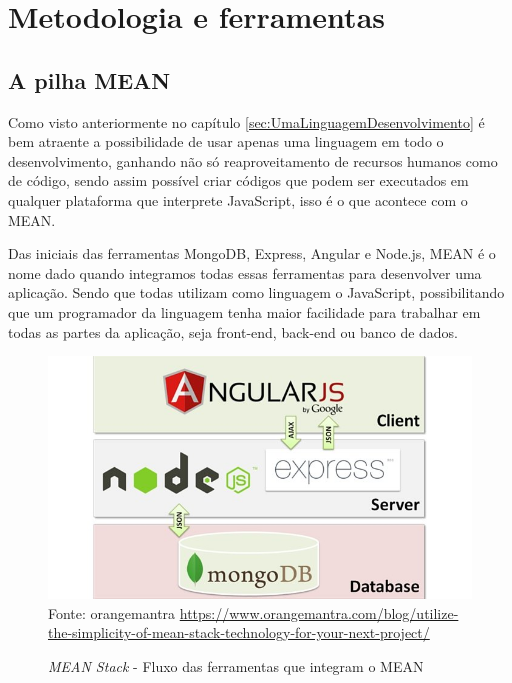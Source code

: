 \documentclass[
	12pt,				%
	openright,			%
	twoside,			%
	a4paper,			%
	english,			%
	brazil				%
	]{abntex2}
\begin{document}
\chapter{Metodologia e ferramentas}

\section{A pilha MEAN}

Como visto anteriormente no capítulo \ref{sec:UmaLinguagemDesenvolvimento} é bem atraente a possibilidade de usar apenas uma linguagem em todo o desenvolvimento, ganhando não só reaproveitamento de recursos humanos como de código, sendo assim possível criar códigos que podem ser executados em qualquer plataforma que interprete JavaScript, isso é o que acontece com o MEAN.

Das iniciais das ferramentas MongoDB, Express, Angular e Node.js, MEAN é o nome dado quando integramos todas essas ferramentas para desenvolver uma aplicação. Sendo que todas utilizam como linguagem o JavaScript, possibilitando que um programador da linguagem tenha maior facilidade para trabalhar em todas as partes da aplicação, seja front-end, back-end ou banco de dados.

\begin{figure}[h]
	\centering

	\caption{\textit{MEAN Stack} - Fluxo das ferramentas que integram o MEAN} \label{fig:MEANStackFlow}
    \includegraphics[scale=0.5]{mean-stack-flow} \\
    Fonte: {orangemantra \url{https://www.orangemantra.com/blog/utilize-the-simplicity-of-mean-stack-technology-for-your-next-project/}}

\end{figure}
\end{document}
